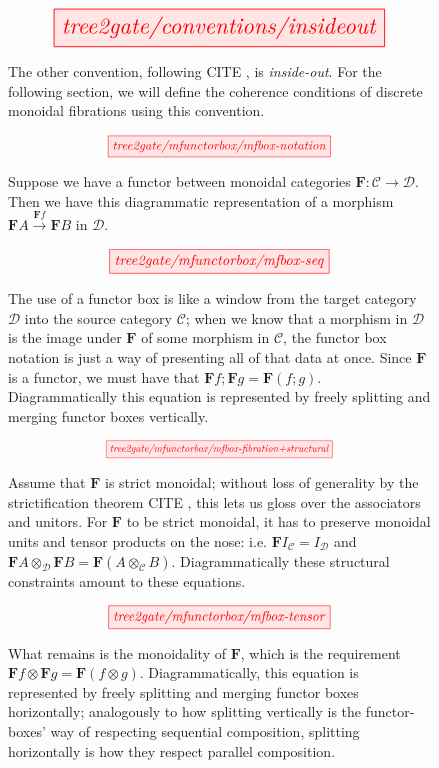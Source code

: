 \begin{figure}[h!]\label{fig:insideout}
\centering
\[\resizebox{0.75\textwidth}{!}{\tikzfig{tree2gate/conventions/insideout}}\]
\caption{The other convention, following \bR CITE \e, is \emph{inside-out}. For the following section, we will define the coherence conditions of discrete monoidal fibrations using this convention.}
\end{figure}

\begin{figure}[h!]
\[\resizebox{0.5\textwidth}{!}{\tikzfig{tree2gate/mfunctorbox/mfbox-notation}}\]
\caption{Suppose we have a functor between monoidal categories $\mathbf{F}: \mathcal{C} \rightarrow \mathcal{D}$. Then we have this diagrammatic representation of a morphism $\mathbf{F}A \overset{\mathbf{F}f}{\rightarrow} \mathbf{F}B$ in $\mathcal{D}$.}
\end{figure}

\begin{figure}[h!]
\[\resizebox{0.5\textwidth}{!}{\tikzfig{tree2gate/mfunctorbox/mfbox-seq}}\]
\caption{The use of a functor box is like a window from the target category $\mathcal{D}$ into the source category $\mathcal{C}$; when we know that a morphism in $\mathcal{D}$ is the image under $\mathbf{F}$ of some morphism in $\mathcal{C}$, the functor box notation is just a way of presenting all of that data at once. Since $\mathbf{F}$ is a functor, we must have that $\mathbf{F}f ; \mathbf{F}g = \mathbf{F}(f;g)$. Diagrammatically this equation is represented by freely splitting and merging functor boxes vertically.}
\end{figure}

\begin{figure}[h!]
\[\resizebox{0.5\textwidth}{!}{\tikzfig{tree2gate/mfunctorbox/mfbox-fibration+structural}}\]
\caption{Assume that $\mathbf{F}$ is strict monoidal; without loss of generality by the strictification theorem \bR CITE \e, this lets us gloss over the associators and unitors. For $\mathbf{F}$ to be strict monoidal, it has to preserve monoidal units and tensor products on the nose: i.e. $\mathbf{F}I_\mathcal{C} = I_\mathcal{D}$ and $\mathbf{F}A \otimes_\mathcal{D} \mathbf{F}B = \mathbf{F}(A \otimes_\mathcal{C} B)$. Diagrammatically these structural constraints amount to these equations.}
\end{figure}

\begin{figure}[h!]
\[\resizebox{0.5\textwidth}{!}{\tikzfig{tree2gate/mfunctorbox/mfbox-tensor}}\]
\caption{What remains is the monoidality of $\mathbf{F}$, which is the requirement $\mathbf{F}f \otimes \mathbf{F}g = \mathbf{F}(f \otimes g)$. Diagrammatically, this equation is represented by freely splitting and merging functor boxes horizontally; analogously to how splitting vertically is the functor-boxes' way of respecting sequential composition, splitting horizontally is how they respect parallel composition.}
\end{figure}

